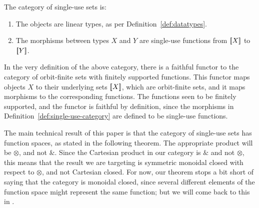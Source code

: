 \documentclass[a4paper,UKenglish,cleveref, autoref, numberwithinsect, thm-restate]{lipics-v2021}
\begin{document}
\begin{definition}\label{def:single-use-category}
    The category of single-use sets is:
    \begin{enumerate}
        \item The objects are linear types, as per Definition~\ref{def:datatypes}.
        \item The morphisms between types $X$ and $Y$ are single-use functions from $[{\kern-0.45ex}[X]{\kern-0.45ex}]$ to $[{\kern-0.45ex}[Y]{\kern-0.45ex}]$.
    \end{enumerate}
\end{definition}

In the very definition of the above category, there is a faithful functor to the category of  orbit-finite sets with finitely supported functions. This functor maps objects $X$ to their underlying sets $[{\kern-0.45ex}[X]{\kern-0.45ex}]$, which are orbit-finite sets, and it maps morphisms to the corresponding functions. The functions seen to be finitely supported, and the functor is faithful  by definition, since the morphisms in Definition~\ref{def:single-use-category} are defined to be single-use functions. 






 
The main technical result of this paper is that the category of single-use sets has function spaces, as stated in the following theorem.  The appropriate product will be $\otimes$, and not $\&$. Since the Cartesian product in our category is $\&$ and not $\otimes$, this means that the result we are targeting is symmetric monoidal closed with respect to $\otimes$, and not Cartesian closed.  For now, our theorem stops a bit short of saying that the category is monoidal closed, since several different elements of the function space might represent the same function; but we will come back to this in .
\end{document}
